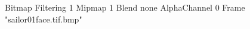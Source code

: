 {Bitmap
	{Filtering 1}
	{Mipmap 1}
	{Blend none}
	{AlphaChannel 0}
	{Frame "sailor01face.tif.bmp"}
}
